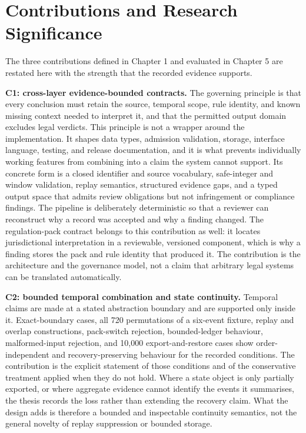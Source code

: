 \section{Contributions and Research Significance}

The three contributions defined in Chapter 1 and evaluated in Chapter 5 are restated here with the strength that the recorded evidence supports.

\textbf{C1: cross-layer evidence-bounded contracts.} The governing principle is that every conclusion must retain the source, temporal scope, rule identity, and known missing context needed to interpret it, and that the permitted output domain excludes legal verdicts. This principle is not a wrapper around the implementation. It shapes data types, admission validation, storage, interface language, testing, and release documentation, and it is what prevents individually working features from combining into a claim the system cannot support. Its concrete form is a closed identifier and source vocabulary, safe-integer and window validation, replay semantics, structured evidence gaps, and a typed output space that admits review obligations but not infringement or compliance findings. The pipeline is deliberately deterministic so that a reviewer can reconstruct why a record was accepted and why a finding changed. The regulation-pack contract belongs to this contribution as well: it locates jurisdictional interpretation in a reviewable, versioned component, which is why a finding stores the pack and rule identity that produced it. The contribution is the architecture and the governance model, not a claim that arbitrary legal systems can be translated automatically.

\textbf{C2: bounded temporal combination and state continuity.} Temporal claims are made at a stated abstraction boundary and are supported only inside it. Exact-boundary cases, all 720 permutations of a six-event fixture, replay and overlap constructions, pack-switch rejection, bounded-ledger behaviour, malformed-input rejection, and 10{,}000 export-and-restore cases show order-independent and recovery-preserving behaviour for the recorded conditions. The contribution is the explicit statement of those conditions and of the conservative treatment applied when they do not hold. Where a state object is only partially exported, or where aggregate evidence cannot identify the events it summarises, the thesis records the loss rather than extending the recovery claim. What the design adds is therefore a bounded and inspectable continuity semantics, not the general novelty of replay suppression or bounded storage.

